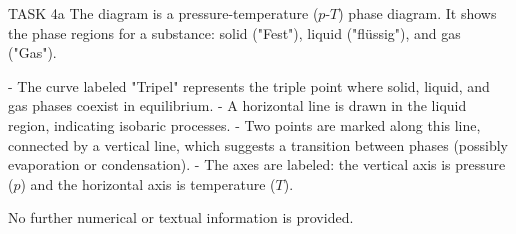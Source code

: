 TASK 4a  
The diagram is a pressure-temperature (\( p \)-\( T \)) phase diagram. It shows the phase regions for a substance: solid ("Fest"), liquid ("flüssig"), and gas ("Gas").  

- The curve labeled "Tripel" represents the triple point where solid, liquid, and gas phases coexist in equilibrium.  
- A horizontal line is drawn in the liquid region, indicating isobaric processes.  
- Two points are marked along this line, connected by a vertical line, which suggests a transition between phases (possibly evaporation or condensation).  
- The axes are labeled: the vertical axis is pressure (\( p \)) and the horizontal axis is temperature (\( T \)).  

No further numerical or textual information is provided.